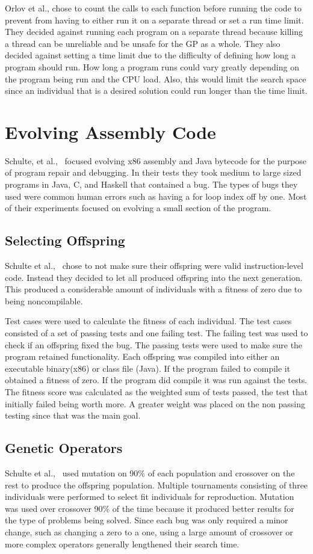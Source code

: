 \documentclass{sig-alternate}
\begin{document}
Orlov et al., chose to count the calls to each function before running the code to prevent from having to either run it on a separate thread or set a run time limit. They decided against running each program on a separate thread because killing a thread can be unreliable and be unsafe for the GP as a whole. They also decided against setting a time limit due to the difficulty of defining how long a program should run. How long a program runs could vary greatly depending on the program being run and the CPU load. Also, this would limit the search space since an individual that is a desired solution could run longer than the time limit.


\section{Evolving Assembly Code}
Schulte, et al.,~\cite{Assembly:2010} focused evolving x86 assembly and Java bytecode for the purpose of program repair and debugging. In their tests they took medium to large sized programs in Java, C, and Haskell that contained a bug. The types of bugs they used were common human errors such as having a for loop index off by one. Most of their experiments focused on evolving a small section of the program. 
\subsection{Selecting Offspring } 
Schulte et al.,~\cite{Assembly:2010} chose to not make sure their offspring were valid instruction-level code. Instead they decided to let all produced offspring into the next generation. This produced a considerable amount of individuals with a fitness of zero due to being noncompilable.

Test cases were used to calculate the fitness of each individual. The test cases consisted of a set of passing tests and one failing test. The failing test was used to check if an offspring fixed the bug. The passing tests were used to make sure the program retained functionality. Each offspring was compiled into either an executable binary(x86) or class file (Java). If the program failed to compile it obtained a fitness of zero. If the program did compile it was run against the tests. The fitness score was calculated as the weighted sum of tests passed, the test that initially failed being worth more. A greater weight was placed on the non passing testing since that was the main goal.

\subsection{Genetic Operators}
Schulte et al.,~\cite{Assembly:2010} used mutation on 90\% of each population and crossover on the rest to produce the offspring population. Multiple tournaments consisting of three individuals were performed to select fit individuals for reproduction. Mutation was used over crossover 90\% of the time because it produced better results for the type of problems being solved. Since each bug was only required a minor change, such as changing a zero to a one, using a large amount of crossover or more complex operators generally lengthened their search time.
\end{document}
